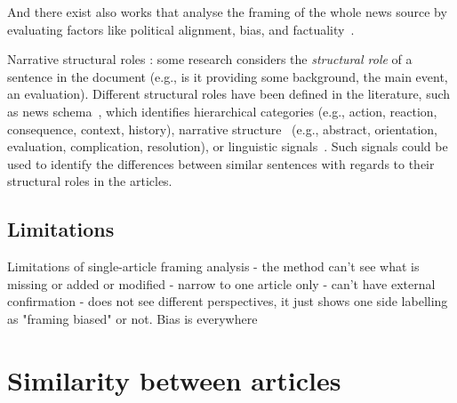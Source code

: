 And there exist also works that analyse the framing of the whole news source by evaluating factors like political alignment, bias, and factuality~\cite{yin2008truth}.



Narrative structural roles
\cite{zahid2019towards}:
some research considers the \emph{structural role} of a sentence in the document (e.g., is it providing some background, the main event, an evaluation).
Different structural roles have been defined in the literature, such as 
news schema~\cite{bell1991language}, which identifies hierarchical categories (e.g., action, reaction, consequence, context, history), narrative structure~\cite{bell2005news} (e.g., abstract, orientation, evaluation, complication, resolution), or linguistic signals~\cite{zahid2019towards,marcu2000theory}. 
Such signals could be used to identify the differences between similar sentences with regards to their structural roles in the articles. 

\subsection{Limitations}
\label{ssec:lit_framing_limit}

Limitations of single-article framing analysis
- the method can't see what is missing or added or modified
- narrow to one article only
- can't have external confirmation
- does not see different perspectives, it just shows one side labelling as "framing biased" or not. Bias is everywhere





\section{Similarity between articles}
\label{sec:lit_relationships}

